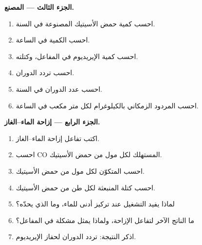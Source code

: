 \begin{problem}
\medskip\noindent\textbf{الجزء الثالث --- المصنع.}
\begin{enumerate}[resume]
  \item احسب كمية حمض الأسيتيك المصنوعة في السنة.
  \item احسب الكمية في الساعة.
  \item احسب كمية الإيريديوم في المفاعل، وكتلته.
  \item احسب تردد الدوران.
  \item احسب عدد الدوران في السنة.
  \item احسب المردود الزمكاني بالكيلوغرام لكل متر مكعب في الساعة.
\end{enumerate}

\medskip\noindent\textbf{الجزء الرابع --- إزاحة الماء--الغاز.}
\begin{enumerate}[resume]
  \item اكتب تفاعل إزاحة الماء--الغاز.
  \item احسب CO المستهلك لكل مول من حمض الأسيتيك.
  \item احسب  المتكوّن لكل مول من حمض الأسيتيك.
  \item احسب كتلة  المنبعثة لكل طن من حمض الأسيتيك.
  \item لماذا يفيد التشغيل عند تركيز أدنى للماء، وما الذي يحدّه؟
  \item ما الناتج الآخر لتفاعل الإزاحة، ولماذا يمثل مشكلة في
        المفاعل؟
  \item اذكر النتيجة: تردد الدوران لحفاز الإيريديوم.
\end{enumerate}
\end{problem}
